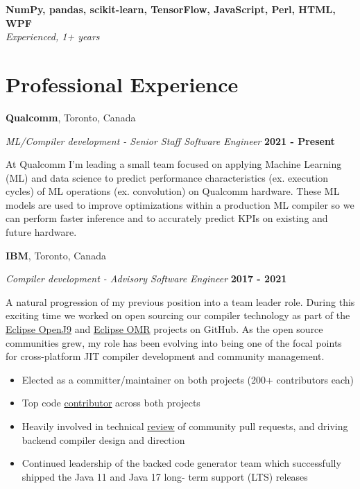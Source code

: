 \documentclass[margin,line]{res}
\begin{document}
\begin{resume}
{\bf NumPy, pandas, scikit-learn, TensorFlow, JavaScript, Perl, HTML, WPF } \\
{\em Experienced, 1+ years}

\section{\sc Professional Experience}

{\bf Qualcomm}, Toronto, Canada

{\em ML/Compiler development - Senior Staff Software Engineer} \hfill {\bf 2021 - Present}
\vspace{-.12in}

At Qualcomm I'm leading a small team focused on applying Machine Learning (ML) and data science to predict performance
characteristics (ex. execution cycles) of ML operations (ex. convolution) on Qualcomm hardware. These ML models are
used to improve optimizations within a production ML compiler so we can perform faster inference and to accurately
predict KPIs on existing and future hardware.

{\bf IBM}, Toronto, Canada

{\em Compiler development - Advisory Software Engineer} \hfill {\bf 2017 - 2021}
\vspace{-.12in}

A natural progression of my previous position into a team leader role. During this exciting time we worked on open
sourcing our compiler technology as part of the \href{https://github.com/eclipse/openj9}{Eclipse OpenJ9} and 
\href{https://github.com/eclipse/omr}{Eclipse OMR} projects on GitHub. As the open source communities grew, my role has
been evolving into being one of the focal points for cross-platform JIT compiler development and community management.

\vspace{.10in}

\begin{itemize}
\item Elected as a committer/maintainer on both projects (200+ contributors each)
\item Top code 
\href{https://github.com/eclipse/omr/graphs/contributors?from=2016-03-06&to=2021-09-24&type=c}{contributor}
across both projects
\item Heavily involved in technical
\href{https://github.com/eclipse/omr/pulls?q=is%3Apr+sort%3Aupdated-desc+reviewed-by%3Afjeremic+is%3Aclosed+}{review}
of community pull requests, and driving backend compiler design and direction
\item Continued leadership of the backed code generator team which successfully shipped the Java 11 and Java 17 long-
term support (LTS) releases
\end{itemize}


\end{resume}
\end{document}
